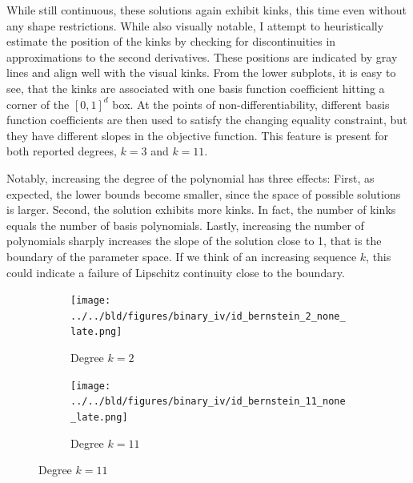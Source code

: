 \documentclass[12pt,a4paper,english]{article} %
\numberwithin{equation}{section}
\theoremstyle{definition}
\theoremstyle{remark}
\theoremstyle{plain}
\begin{document}
While still continuous, these solutions again exhibit kinks, this time even without any shape restrictions.
While also visually notable, I attempt to heuristically estimate the position of the kinks by checking for discontinuities in approximations to the second derivatives.
These positions are indicated by gray lines and align well with the visual kinks.
From the lower subplots, it is easy to see, that the kinks are associated with one basis function coefficient hitting a corner of the $[0,1]^d$ box.
At the points of non-differentiability, different basis function coefficients are then used to satisfy the changing equality constraint, but they have different slopes in the objective function.
This feature is present for both reported degrees, $k=3$ and $k=11$.

Notably, increasing the degree of the polynomial has three effects:
First, as expected, the lower bounds become smaller, since the space of possible solutions is larger.
Second, the solution exhibits more kinks. In fact, the number of kinks equals the number of basis polynomials.
Lastly, increasing the number of polynomials sharply increases the slope of the solution close to 1, that is the boundary of the parameter space.
If we think of an increasing sequence $k$, this could indicate a failure of Lipschitz continuity close to the boundary.

\begin{figure}

  \caption{Identified Sets for the Binary-IV Model with Bernstein Polynomial MTRs}\label{fig:id_set_binary_iv_bernstein}

  \centering
  \begin{subfigure}[b]{0.49\textwidth}
      \centering
      \texttt{[image: ../../bld/figures/binary\_iv/id\_bernstein\_2\_none\_late.png]}
      \caption{Degree $k=2$}\label{fig:id_set_binary_iv_bernstein_k_2}
  \end{subfigure}
  \hfill
  \begin{subfigure}[b]{0.49\textwidth}
      \centering
      \texttt{[image: ../../bld/figures/binary\_iv/id\_bernstein\_11\_none\_late.png]}
      \caption{Degree $k=11$}\label{fig:id_set_binary_iv_bernstein_k_11}
  \end{subfigure}
\end{figure}
\end{document}
